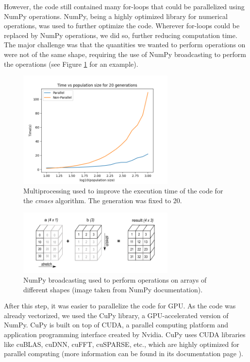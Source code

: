 \medskip

However, the code still contained many for-loops that could be parallelized using NumPy operations. NumPy, being a highly optimized library for numerical 
operations, was used to further optimize the code. Wherever for-loops could be replaced by NumPy operations, we did so, further reducing computation time. 
The major challenge was that the quantities we wanted to perform operations on were not of the same shape, requiring the use of NumPy broadcasting to 
perform the operations (see Figure \ref{fig:broadcasting} for an example).

\medskip

\begin{figure}[h]
    \centering
    \includegraphics[width=0.7\textwidth]{images/multiprocessing.png}
    \caption{Multiprocessing used to improve the execution time of the code for the \textit{cmaes} algorithm. The generation was fixed to 20.}
\end{figure}

\begin{figure}[h]
    \centering
    \includegraphics[width=0.7\textwidth]{images/broadcasting.png}
    \caption{NumPy broadcasting used to perform operations on arrays of different shapes (image taken from NumPy documentation).}
    \label{fig:broadcasting}
\end{figure}

\FloatBarrier

After this step, it was easier to parallelize the code for GPU. As the code was already vectorized, we used the CuPy library, a GPU-accelerated 
version of NumPy. CuPy is built on top of CUDA, a parallel computing platform and application programming interface created by Nvidia. CuPy uses 
CUDA libraries like cuBLAS, cuDNN, cuFFT, cuSPARSE, etc., which are highly optimized for parallel computing (more information can be found in its 
documentation page \cite{cupy}).

